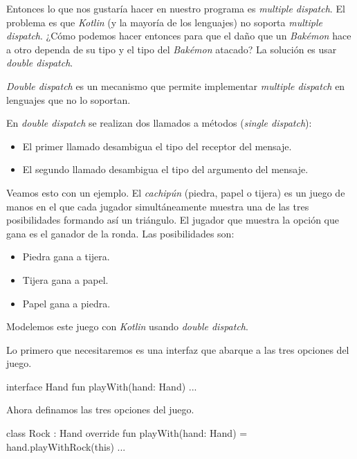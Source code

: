   Entonces lo que nos gustaría hacer en nuestro programa es \textit{multiple dispatch}.
  El problema es que \textit{Kotlin} (y la mayoría de los lenguajes) no soporta \textit{multiple
  dispatch}.
  ¿Cómo podemos hacer entonces para que el daño que un \textit{Bakémon} hace a otro dependa de su
  tipo y el tipo del \textit{Bakémon} atacado?
  La solución es usar \textit{double dispatch}.

  \begin{defaultbox}

    \textit{Double dispatch} es un mecanismo que permite implementar \textit{multiple dispatch} en
    lenguajes que no lo soportan.
    
    En \textit{double dispatch} se realizan dos llamados a métodos (\textit{single dispatch}):
    \begin{itemize}
      \item El primer llamado desambigua el tipo del receptor del mensaje.
      \item El segundo llamado desambigua el tipo del argumento del mensaje.
    \end{itemize}
  \end{defaultbox}

  Veamos esto con un ejemplo.
  El \textit{cachipún} (piedra, papel o tijera) es un juego de manos en el que cada jugador
  simultáneamente muestra una de las tres posibilidades formando así un triángulo.
  El jugador que muestra la opción que gana es el ganador de la ronda.
  Las posibilidades son:

  \begin{itemize}
    \item Piedra gana a tijera.
    \item Tijera gana a papel.
    \item Papel gana a piedra.
  \end{itemize}

  Modelemos este juego con \textit{Kotlin} usando \textit{double dispatch}.

  Lo primero que necesitaremos es una interfaz que abarque a las tres opciones del juego.

  \begin{kotlin}
    interface Hand {
      fun playWith(hand: Hand)
      ...
    }
  \end{kotlin}

  Ahora definamos las tres opciones del juego.

  \begin{kotlin}
    class Rock : Hand {
      override fun playWith(hand: Hand) = hand.playWithRock(this)
      ...
    }
  \end{kotlin}

